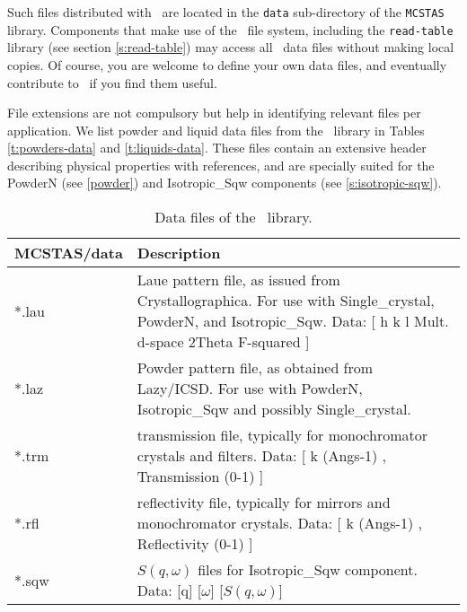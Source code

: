 Such files distributed with \MCS\ are located in the
\verb+data+ sub-directory of the \verb+MCSTAS+ library.
Components that make use of the \MCS\ file system,
including the \verb+read-table+ library (see section \ref{s:read-table})
may access all \MCS\ data files without making local copies.
Of course, you are welcome to define your own data files,
and eventually contribute to \MCS\ if you find them useful.

File extensions are not compulsory but help in identifying relevant files per application. We list powder and liquid data files from the \MCS\ library in Tables \ref{t:powders-data} and \ref{t:liquids-data}. These files contain an extensive header describing physical properties with references, and are specially suited for the PowderN (see \ref{powder}) and Isotropic\_Sqw components (see \ref{s:isotropic-sqw}).

\begin{table}
  \begin{center}
    {\let\my=\\
    \begin{tabular}{|p{}|p{}|}
      \hline
       {\bf MCSTAS/data} & Description \\
       \hline
 *.lau & Laue pattern file, as issued from Crystallographica.
       For use with Single\_crystal, PowderN, and Isotropic\_Sqw.
       Data: [ h   k   l Mult. d-space 2Theta   F-squared ] \\
 *.laz & Powder pattern file, as obtained from Lazy/ICSD.
       For use with PowderN, Isotropic\_Sqw and possibly Single\_crystal.\\
 *.trm & transmission file, typically for monochromator crystals and filters.
       Data: [ k (Angs-1) , Transmission (0-1) ] \\
 *.rfl & reflectivity file, typically for mirrors and monochromator crystals.
       Data: [ k (Angs-1) , Reflectivity (0-1) ] \\
 *.sqw & $S(q,\omega)$ files for Isotropic\_Sqw component.
       Data: [q] [$\omega$] [$S(q,\omega)$]\\
      \hline
    \end{tabular}
    \caption{Data files of the \MCS\ library.}
    \label{t:comp-data}
    }
  \end{center}
\end{table}

